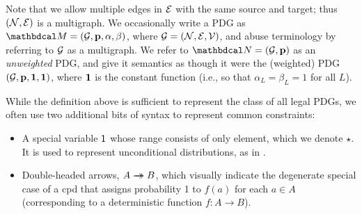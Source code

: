 \documentclass[the-pdg-manual.tex]{subfiles}
\begin{document}
	Note that we allow multiple edges in $\mathcal E$ with the same source and
target; thus $(\mathcal N,\mathcal E)$ is a multigraph.  We occasionally write a PDG
as $\dg M = (\Gr, \mat p, \alpha,\beta)$, where $\mathcal G = (\mathcal N,\mathcal E,\mathcal V)$, and
abuse terminology by referring to $\mathcal G$ as a multigraph.
We refer to 
${\dg N} = (\Gr, \mat p)$ as an \emph{unweighted} PDG,
and give it semantics as though it were the (weighted) PDG $(\mathcal G, \mathbf p, \mathbf 1, \mathbf 1)$, where
$\bf 1$ is the constant function (i.e., so that $\alpha_L = \beta_L = 1$ for all $L$). 


While the definition above is sufficient to represent the class of all legal
PDGs, we often use two additional bits of syntax to represent common
constraints:  
    	
\begin{itemize}
    \item A special variable $\sf 1$ whose range consists of only element, which
    we denote $\star$. It is used to represent unconditional distributions, as
    in .  

	\item Double-headed arrows, $A \rightarrow\mathrel{\mspace{-15mu}}\rightarrow
      B$, which visually indicate the degenerate special
          case of a cpd that assigns probability 1 to $f(a)$
          for each $a \in A$ (corresponding to a deterministic
          function $f : A \to B$). 
\end{itemize}
\end{document}
